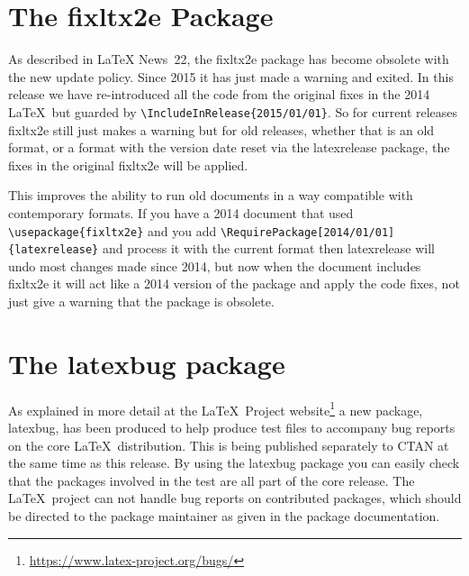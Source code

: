 \documentclass{ltnews}
\begin{document}
\section{The \textsf{fixltx2e} Package}
As described in \LaTeX{} News~22, the \textsf{fixltx2e} package has become
obsolete with the new update policy. Since 2015 it has just made a
warning and exited.  In this release we have re-introduced all
the code from the original fixes in the 2014 \LaTeX\ but guarded by
\verb|\IncludeInRelease{2015/01/01}|.
So for current releases \textsf{fixltx2e} still just makes a warning
but for old releases, whether that is an old format, or a format with
the version date reset via  the \textsf{latexrelease} package, the
fixes in the original \textsf{fixltx2e} will be applied.

This improves the ability to run old documents in a way compatible
with contemporary formats. If you have a 2014 document that used
\verb|\usepackage{fixltx2e}| and you add
\verb|\RequirePackage[2014/01/01]{latexrelease}| and process it with the
current format then \textsf{latexrelease} will undo most changes made
since 2014, but now when the document includes \textsf{fixltx2e} it
will act like a 2014 version of the package and apply the code fixes,
not just give a warning that the package is obsolete.

\section{The \textsf{latexbug} package}

As explained in more detail
at the \LaTeX\ Project
  website\footnote{\url{https://www.latex-project.org/bugs/}}
a new package, \textsf{latexbug}, has been produced to help produce
test files to accompany bug reports on the core \LaTeX\ distribution.
This is being published separately to CTAN at the same time as this
release. By using the \textsf{latexbug} package you can easily check
that the packages involved in the test are all part of the core
release. The \LaTeX\ project can not handle bug reports on contributed
packages, which should be directed to the package maintainer as given
in the package documentation.
\end{document}
